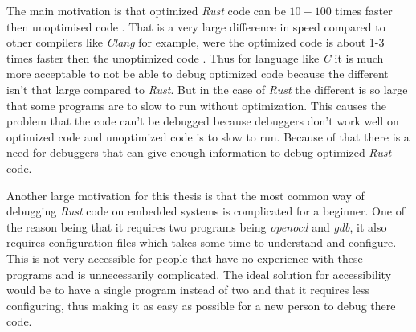 


The main motivation is that optimized \emph{Rust} code can be $10-100$ times faster then unoptimised code \cite{perf-book}.
That is a very large difference in speed compared to other compilers like \emph{Clang} for example, were the optimized code is about 1-3 times faster then the unoptimized code \cite{clang-opt}.
Thus for language like \emph{C} it is much more acceptable to not be able to debug optimized code because the different isn't that large compared to \emph{Rust}.
But in the case of \emph{Rust} the different is so large that some programs are to slow to run without optimization.
This causes the problem that the code can't be debugged because debuggers don't work well on optimized code and unoptimized code is to slow to run.
Because of that there is a need for debuggers that can give enough information to debug optimized \emph{Rust} code.


Another large motivation for this thesis is that the most common way of debugging \emph{Rust} code on embedded systems is complicated for a beginner.
One of the reason being that it requires two programs being \emph{openocd} and \emph{gdb}, it also requires configuration files which takes some time to understand and configure.
This is not very accessible for people that have no experience with these programs and is unnecessarily complicated.
The ideal solution for accessibility would be to have a single program instead of two and that it requires less configuring, thus making it as easy as possible for a new person to debug there code.


